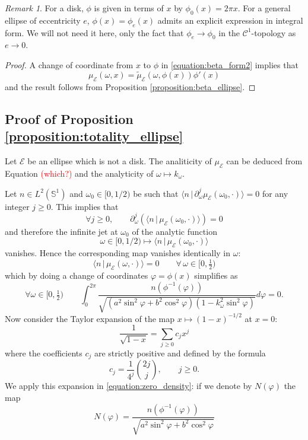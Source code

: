 \documentclass[12pt, openany]{amsart}
\theoremstyle{definition}
\theoremstyle{remark}
\theoremstyle{remark}
\newtheorem{remark}[theorem]{Remark}
\theoremstyle{theorem}
\theoremstyle{theorem}
\theoremstyle{theorem}
\theoremstyle{theorem}
\renewcommand{\SS}{\mathbb{S}}
\begin{document}
\begin{remark}
For a disk, $\phi$ is given in terms of $x$ by $\phi_0(x) = 2\pi x$. For a general ellipse of eccentricity $e$, $\phi(x) = \phi_e(x)$ admits an explicit expression in integral form. We will not need it here, only the fact that $\phi_e\to\phi_0$ in the $\mathscr C^1$-topology as $e\to 0$.
\end{remark}

\begin{proof}
A change of coordinate from $x$ to $\phi$ in  \eqref{equation:beta_form2} implies that
\[
\mu_{\mathscr E}(\omega,x)= \tilde\mu_{\mathscr E}(\omega,\phi(x))\phi'(x)
\] 
and the result follows from Proposition \ref{proposition:beta_ellipse}.
\end{proof}




\subsection{Proof of Proposition \ref{proposition:totality_ellipse}}
\label{subsection:proof_totality}

Let $\mathscr E$ be an ellipse which is not a disk. The analiticity of $\mu_{\mathscr E}$ can be deduced from Equation \textcolor{red}{(which?)} and the analyticity of $\omega\mapsto k_{\omega}$.

Let $n\in L^2(\SS^1)$ and $\omega_0\in[0,1/2)$ be such that $\langle n\,|\,\partial_{\omega}^j\mu_{\mathscr E}(\omega_0,\cdot)\rangle = 0$ for any integer $j\geq 0$. This implies that
\[
\forall j\geq 0,\qquad \partial_{\omega}^j\left(\langle n\,|\,\mu_{\mathscr E}(\omega_0,\cdot)\rangle\right) = 0
\]
and therefore the infinite jet at $\omega_0$ of the analytic function
\[
\omega\in[0,1/2)\mapsto \langle n\,|\,\mu_{\mathscr E}(\omega_0,\cdot)\rangle
\]
vanishes. Hence the corresponding map vanishes identically in $\omega$:
\[
\langle n\,|\,\mu_{\mathscr E}(\omega,\cdot)\rangle = 0 \qquad \forall\,\omega\in[0,\tfrac{1}{2})
\]
which by doing a change of coordinates $\varphi = \phi(x)$ simplifies as
\begin{equation}
\label{equation:zero_density}
\forall\omega\in[0,\tfrac{1}{2})\qquad
\int_0^{2\pi}
\frac{n(\phi^{-1}(\varphi))} 
{\sqrt{(a^2\sin^2\varphi+b^2\cos^2\varphi)(1-k_{\omega}^2\sin^2\varphi)}}d\varphi =0.
\end{equation}
Now consider the Taylor expansion of the map $x\mapsto(1-x)^{-1/2}$ at $x=0$: 
\[
\frac{1}{\sqrt{1-x}} = \sum_{j\geq 0} c_j x^j
\]
where the coefficients $c_j$ are strictly positive and defined by the formula
\[
c_j = \frac{1}{4^j}\binom{2j}{j},\qquad j\geq 0.
\]
We apply this expansion in  \eqref{equation:zero_density}: if we denote by $N(\varphi)$ the map 
\[
N(\varphi) = \frac{n(\phi^{-1}(\varphi))} 
{\sqrt{a^2\sin^2\varphi+b^2\cos^2\varphi}}
\]
\end{document}
